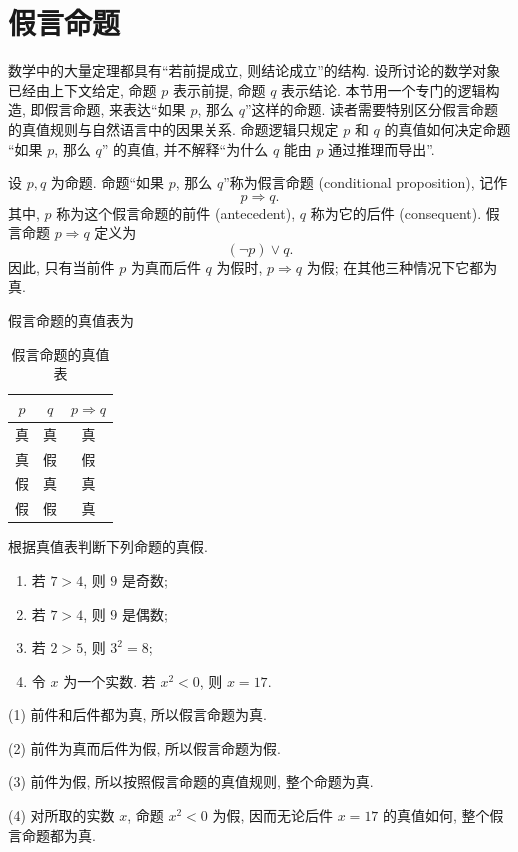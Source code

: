 \documentclass[usesamecnt, thmcnt=section, lang=cn, newtx, 10pt, scheme=chinese]{elegantbook}
\begin{document}
\section{假言命题}

数学中的大量定理都具有``若前提成立, 则结论成立''的结构. 设所讨论的数学对象已经由上下文给定, 命题 $p$ 表示前提, 命题 $q$ 表示结论. 本节用一个专门的逻辑构造, 即假言命题, 来表达``如果 $p$, 那么 $q$''这样的命题. 读者需要特别区分假言命题的真值规则与自然语言中的因果关系. 命题逻辑只规定 $p$ 和 $q$ 的真值如何决定命题 ``如果 $p$, 那么 $q$'' 的真值, 并不解释``为什么 $q$ 能由 $p$ 通过推理而导出''.

\begin{definition}\label{def:implication}
设 $p,q$ 为命题. 命题``如果 $p$, 那么 $q$''称为{\color{blue}假言命题 (conditional proposition)}, 记作
\[
 p\Rightarrow q.
\]
其中, $p$ 称为这个假言命题的{\color{blue}前件 (antecedent)}, $q$ 称为它的{\color{blue}后件 (consequent)}. 假言命题 $p\Rightarrow q$ 定义为
\[
 (\neg p)\vee q.
\]
因此, 只有当前件 $p$ 为真而后件 $q$ 为假时, $p\Rightarrow q$ 为假; 在其他三种情况下它都为真.
\end{definition}

假言命题的真值表为
\begin{table}[H]
\centering
\caption{假言命题的真值表}
\label{tab:implication}
\begin{tabular}{|c|c|c|}
\hline
$p$ & $q$ & $p\Rightarrow q$\\
\hline
真 & 真 & 真\\
真 & 假 & 假\\
假 & 真 & 真\\
假 & 假 & 真\\
\hline
\end{tabular}
\end{table}

\begin{concept}
\label{con:logic-05}
根据真值表判断下列命题的真假.
\begin{enumerate}[label=\rm(\arabic*)]
  \item 若 $7>4$, 则 $9$ 是奇数;
  \item 若 $7>4$, 则 $9$ 是偶数;
  \item 若 $2>5$, 则 $3^2=8$;
  \item 令 $x$ 为一个实数. 若 $x^2<0$, 则 $x=17$.
\end{enumerate}
\end{concept}

\begin{solution}
(1) 前件和后件都为真, 所以假言命题为真.

(2) 前件为真而后件为假, 所以假言命题为假.

(3) 前件为假, 所以按照假言命题的真值规则, 整个命题为真.

(4) 对所取的实数 $x$, 命题 $x^2<0$ 为假, 因而无论后件 $x=17$ 的真值如何, 整个假言命题都为真.
\end{solution}
\end{document}
